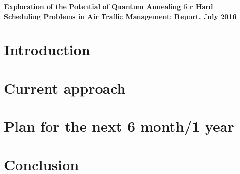 \documentclass[9pt]{extarticle}
\begin{document}
\begin{center}\Large
\textbf{Exploration of the Potential of Quantum Annealing for Hard Scheduling
Problems in Air Traffic Management: Report, July 2016}
\end{center}

\section{Introduction}

\blindmathpaper

\section{Current approach}

\Blindtext

\section{Plan for the next 6 month/1 year}

\Blindtext

\section{Conclusion}

\Blindtext


\end{document}

